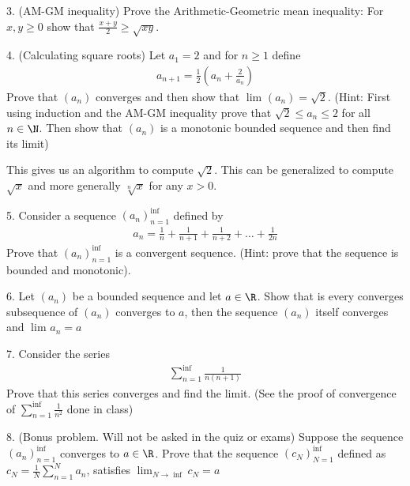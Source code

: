3. (AM-GM inequality) Prove the Arithmetic-Geometric mean inequality: For $x, y \ge 0$ show that $\frac{x+y}{2} \ge \sqrt{xy} $.

4. (Calculating square roots) Let $a_1 = 2 $ and for $n \ge 1$ define
	\begin{align}
		a_{n+1} = \frac{1}{2} \left( a_n + \frac{2}{a_n} \right) 
	\end{align}
Prove that $\left( a_n \right) $ converges and then show that $\lim_{}\left( a_n \right) = \sqrt{2} $. (Hint: First using induction and the AM-GM inequality prove that $\sqrt{2} \le a_n \le 2$ for all $n \in  \N$. Then show that $\left( a_n \right) $ is a monotonic bounded sequence and then find its limit)

\begin{remark}
	This gives us an algorithm to compute $\sqrt{2} $. This can be generalized to compute $\sqrt{x} $ and more generally $\sqrt[n]{x}$ for any $x > 0$. 
\end{remark}


5. Consider a sequence $\left( a_n \right)_{n=1}^{\inf }$ defined by 
\begin{align}
	a_n = \frac{1}{n} + \frac{1}{n+1} + \frac{1}{n+2} + \ldots + \frac{1}{2n}
\end{align}
Prove that $\left( a_n \right)_{n=1}^{\inf }$ is a convergent sequence. (Hint: prove that the sequence is bounded and monotonic).

6. Let $\left( a_n \right) $ be a bounded sequence and let $a \in \R$. Show that is every converges subsequence of $\left( a_n \right) $ converges to $a$, then the sequence $\left( a_n \right) $ itself converges and $\lim_{} a_n = a$

7. Consider the series 
\begin{align}
	\sum_{n=1}^{\inf } \frac{1}{n\left( n+1 \right) }
\end{align}
Prove that this series converges and find the limit. (See the proof of convergence of $\sum_{n=1}^{\inf } \frac{1}{n^{2}}$ done in class)

8. (Bonus problem. Will not be asked in the quiz or exams) Suppose the sequence $\left( a_n \right)_{n=1}^{\inf }$ converges to $a \in \R$. Prove that the sequence $\left( c_N \right)_{N=1}^{\inf }$ defined as $c_N = \frac{1}{N} \sum_{n=1}^{N} a_n$, satisfies $\lim_{N \to \inf } c_N = a$

